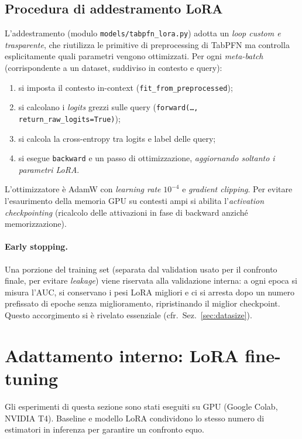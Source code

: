 \documentclass[11pt,a4paper]{article}
\begin{document}
\subsection{Procedura di addestramento LoRA}
L'addestramento (modulo \texttt{models/tabpfn\_lora.py}) adotta un \emph{loop
custom e trasparente}, che riutilizza le primitive di preprocessing di TabPFN ma
controlla esplicitamente quali parametri vengono ottimizzati. Per ogni
\emph{meta-batch} (corrispondente a un dataset, suddiviso in contesto e query):
\begin{enumerate}[nosep]
  \item si imposta il contesto in-context (\texttt{fit\_from\_preprocessed});
  \item si calcolano i \emph{logits} grezzi sulle query
  (\texttt{forward(\dots, return\_raw\_logits=True)});
  \item si calcola la cross-entropy tra logits e label delle query;
  \item si esegue \texttt{backward} e un passo di ottimizzazione,
  \emph{aggiornando soltanto i parametri LoRA}.
\end{enumerate}
L'ottimizzatore è AdamW con \emph{learning rate} $10^{-4}$ e \emph{gradient
clipping}. Per evitare l'esaurimento della memoria GPU su contesti ampi si
abilita l'\emph{activation checkpointing} (ricalcolo delle attivazioni in fase di
backward anziché memorizzazione).

\paragraph{Early stopping.} Una porzione del training set (separata dal
validation usato per il confronto finale, per evitare \emph{leakage}) viene
riservata alla validazione interna: a ogni epoca si misura l'AUC, si conservano i
pesi LoRA migliori e ci si arresta dopo un numero prefissato di epoche senza
miglioramento, ripristinando il miglior checkpoint. Questo accorgimento si è
rivelato essenziale (cfr.\ Sez.~\ref{sec:datasize}).

\section{Adattamento interno: LoRA fine-tuning}
\label{sec:lora}

Gli esperimenti di questa sezione sono stati eseguiti su GPU (Google Colab,
NVIDIA T4). Baseline e modello LoRA condividono lo stesso numero di estimatori in
inferenza per garantire un confronto equo.
\end{document}
